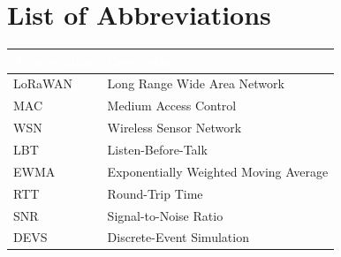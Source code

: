 \chapter*{List of Abbreviations}
\begin{center}
\begin{tabularx}{0.85\textwidth}{@{}lX@{}}
\toprule
\rowcolor{nustgreen}
\textcolor{white}{\bfseries Abbreviation} & \textcolor{white}{\bfseries Description} \\
\midrule
LoRaWAN & Long Range Wide Area Network \\
MAC     & Medium Access Control \\
WSN     & Wireless Sensor Network \\
LBT     & Listen-Before-Talk \\
EWMA    & Exponentially Weighted Moving Average \\
RTT     & Round-Trip Time \\
SNR     & Signal-to-Noise Ratio \\
DEVS    & Discrete-Event Simulation \\
\bottomrule
\end{tabularx}
\end{center}

\clearpage
{}

